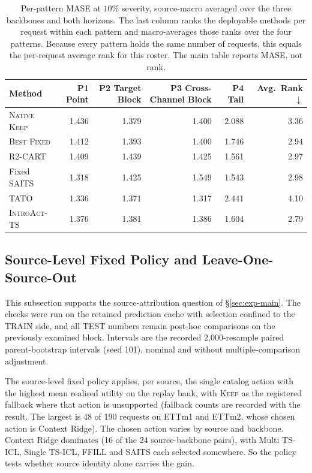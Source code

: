 \documentclass{article}
\newcommand{\introact}{\textsc{IntroAct-TS}}
\begin{document}
\begin{table}[!t]
  \caption{Per-pattern MASE at $10\%$ severity, source-macro averaged over the three
  backbones and both horizons. The last column ranks the deployable methods per request
  within each pattern and macro-averages those ranks over the four patterns. Because every
  pattern holds the same number of requests, this equals the per-request average rank for this roster. The main table reports MASE, not rank.}
  \label{tab:app-pattern-res}
  \centering
  \small
  \setlength{\tabcolsep}{4pt}
\begin{tabular*}{\textwidth}{@{\extracolsep{\fill}}lrrrrr@{}}
    \toprule
    Method & P1 Point & P2 Target Block & P3 Cross-Channel Block & P4 Tail & Avg.\ Rank $\downarrow$ \\
    \midrule
    \textsc{Native Keep} & 1.436 & 1.379 & 1.400 & 2.088 & 3.36 \\
    \textsc{Best Fixed}  & 1.412   & 1.393   & 1.400   & 1.746   & 2.94 \\
    R2-CART              & 1.409   & 1.439   & 1.425   & 1.561   & 2.97 \\
    Fixed SAITS & 1.318 & 1.425 & 1.549 & 1.543 & 2.98 \\
    TATO & 1.336 & 1.371 & 1.317 & 2.441 & 4.10 \\
    \midrule
    \rowcolor{bestgray}\introact{} & 1.376 & 1.381 & 1.386 & 1.604 & 2.79 \\
    \bottomrule
  \end{tabular*}
\end{table}

\subsection{Source-Level Fixed Policy and Leave-One-Source-Out}
\label{app:source-diagnostics}
This subsection supports the source-attribution question of \S\ref{sec:exp-main}. The
checks were run on the retained prediction cache with selection confined to the TRAIN
side, and all TEST numbers remain post-hoc comparisons on the previously examined block.
Intervals are the recorded 2,000-resample paired parent-bootstrap intervals (seed 101),
nominal and without multiple-comparison adjustment.

The source-level fixed policy applies, per source, the single catalog action with the
highest mean realised utility on the replay bank, with \textsc{Keep} as the registered
fallback where that action is unsupported (fallback counts are recorded with the result. The largest is 48 of 190 requests on ETTm1 and ETTm2, whose chosen action is Context
Ridge). The chosen action varies by source and backbone. Context Ridge dominates (16 of
the 24 source-backbone pairs), with Multi TS-ICL, Single TS-ICL, FFILL and SAITS each
selected somewhere. So the policy tests whether
source identity alone carries the gain.
\end{document}
